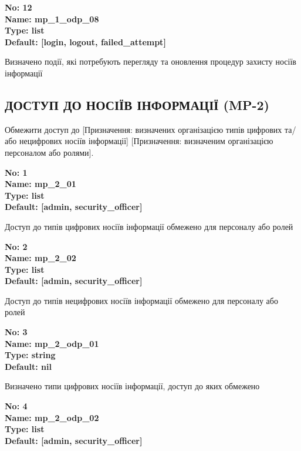\documentclass{article}
\begin{document}
{\footnotesize\bfseries
No: 12\\
Name: mp\_\allowbreak{}1\_\allowbreak{}odp\_\allowbreak{}08\\
Type: list\\
Default: [\textquotedbl{}login\textquotedbl{}, \textquotedbl{}logout\textquotedbl{}, \textquotedbl{}failed\_\allowbreak{}attempt\textquotedbl{}]
}

{\footnotesize Визначено події, які потребують перегляду та оновлення процедур захисту носіїв інформації}




\subsection{ДОСТУП ДО НОСІЇВ ІНФОРМАЦІЇ (MP-2)}
Обмежити доступ до [Призначення: визначених організацією типів цифрових та/або нецифрових носіїв інформації] [Призначення: визначеним організацією персоналом або ролями].

\vspace{10pt}
{\footnotesize\bfseries
No: 1\\
Name: mp\_\allowbreak{}2\_\allowbreak{}01\\
Type: list\\
Default: [\textquotedbl{}admin\textquotedbl{}, \textquotedbl{}security\_\allowbreak{}officer\textquotedbl{}]
}

{\footnotesize Доступ до типів цифрових носіїв інформації обмежено для персоналу або ролей}


{\footnotesize\bfseries
No: 2\\
Name: mp\_\allowbreak{}2\_\allowbreak{}02\\
Type: list\\
Default: [\textquotedbl{}admin\textquotedbl{}, \textquotedbl{}security\_\allowbreak{}officer\textquotedbl{}]
}

{\footnotesize Доступ до типів нецифрових носіїв інформації обмежено для персоналу або ролей}


{\footnotesize\bfseries
No: 3\\
Name: mp\_\allowbreak{}2\_\allowbreak{}odp\_\allowbreak{}01\\
Type: string\\
Default: nil
}

{\footnotesize Визначено типи цифрових носіїв інформації, доступ до яких обмежено}


{\footnotesize\bfseries
No: 4\\
Name: mp\_\allowbreak{}2\_\allowbreak{}odp\_\allowbreak{}02\\
Type: list\\
Default: [\textquotedbl{}admin\textquotedbl{}, \textquotedbl{}security\_\allowbreak{}officer\textquotedbl{}]
}
\end{document}
